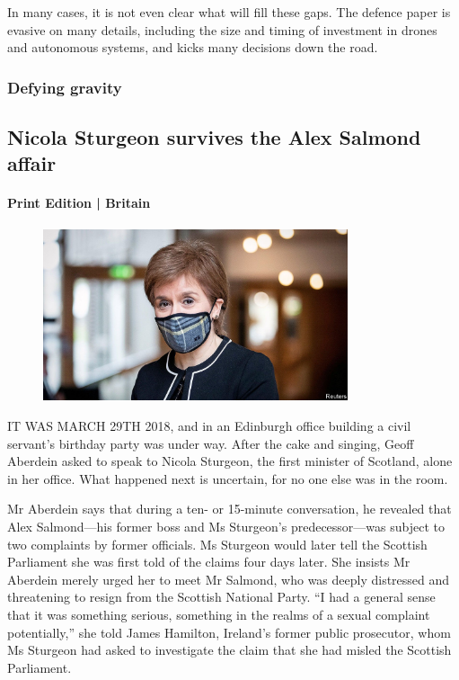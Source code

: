 \documentclass{article}
\begin{document}
In many cases, it is not even clear what will fill these gaps. The defence paper is evasive on many details, including the size and timing of investment in drones and autonomous systems, and kicks many decisions down the road.{} 
\clearpage
\subsubsection{Defying gravity }
\subsection{Nicola Sturgeon survives the Alex Salmond affair }
\paragraph{Print Edition | Britain  \quad \color{gray}{Mar 27th 2021 }}
\begin{figure}[h]
\centering
\includegraphics[width=0.8\textwidth]{images/20210327_brp503.jpg}
\end{figure}
\lettrine{I}T WAS MARCH 29TH 2018, and in an Edinburgh office building a civil servant's birthday party was under way. After the cake and singing, Geoff Aberdein asked to speak to Nicola Sturgeon, the first minister of Scotland, alone in her office. What happened next is uncertain, for no one else was in the room. 

Mr Aberdein says that during a ten- or 15-minute conversation, he revealed that Alex Salmond---his former boss and Ms Sturgeon's predecessor---was subject to two complaints by former officials. Ms Sturgeon would later tell the Scottish Parliament she was first told of the claims four days later. She insists Mr Aberdein merely urged her to meet Mr Salmond, who was deeply distressed and threatening to resign from the Scottish National Party. ``I had a general sense that it was something serious, something in the realms of a sexual complaint potentially,'' she told James Hamilton, Ireland's former public prosecutor, whom Ms Sturgeon had asked to investigate the claim that she had misled the Scottish Parliament. 
\end{document}
